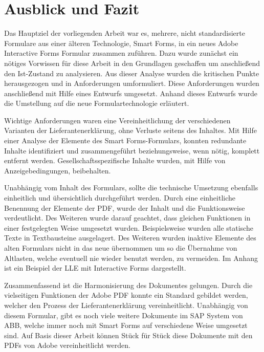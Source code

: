 \chapter{Ausblick und Fazit}
\label{ch:Ausblick}

Das Hauptziel der vorliegenden Arbeit war es, mehrere, nicht standardisierte Formulare aus einer älteren Technologie, Smart Forms,  in ein neues Adobe Interactive Forms Formular zusammen zuführen. Dazu wurde zunächst ein nötiges Vorwissen für diese Arbeit in den Grundlagen geschaffen um anschließend den Ist-Zustand zu analysieren. Aus dieser Analyse wurden die kritischen Punkte herausgezogen und in Anforderungen umformuliert. Diese Anforderungen wurden anschließend mit Hilfe eines Entwurfs umgesetzt. Anhand dieses Entwurfs wurde die Umstellung auf die neue Formulartechnologie erläutert.

Wichtige Anforderungen waren eine Vereinheitlichung der verschiedenen Varianten der Lieferantenerklärung, ohne Verluste seitens des Inhaltes. Mit Hilfe einer Analyse der Elemente des Smart Forms-Formulars, konnten redundante Inhalte identifiziert und zusammengeführt beziehungsweise, wenn nötig, komplett entfernt werden. Gesellschaftsspezifische Inhalte wurden, mit Hilfe von Anzeigebedingungen, beibehalten.

Unabhängig vom Inhalt des Formulars, sollte die technische Umsetzung ebenfalls einheitlich und übersichtlich durchgeführt werden. Durch eine einheitliche Benennung der Elemente der \ac{PDF}, wurde der Inhalt und die Funktionsweise verdeutlicht. Des Weiteren wurde darauf geachtet, dass gleichen Funktionen in einer festgelegten Weise umgesetzt wurden. Beispielsweise wurden alle statische Texte in Textbausteine ausgelagert. Des Weiteren wurden inaktive Elemente des alten Formulars nicht in das neue übernommen um so die Übernahme von Altlasten, welche eventuell nie wieder benutzt werden, zu vermeiden. Im Anhang ist ein Beispiel der \ac{LLE} mit Interactive Forms dargestellt.

Zusammenfassend ist die Harmonisierung des Dokumentes gelungen. Durch die vielseitigen Funktionen der Adobe \ac{PDF} konnte ein Standard gebildet werden, welcher den Prozess der Lieferantenerklärung vereinheitlicht. Unabhängig von diesem Formular, gibt es noch viele weitere Dokumente im SAP System von ABB, welche immer noch mit Smart Forms auf verschiedene Weise umgesetzt sind. Auf Basis dieser Arbeit können Stück für Stück diese Dokumente mit den \ac{PDF}s von Adobe vereinheitlicht werden.

 
